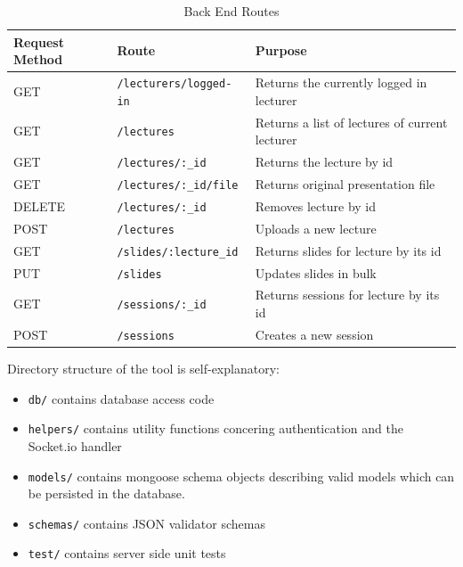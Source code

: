 \begin{table}[h!]
\centering
\begin{tabular}{|l|l|l|}
\hline
\textbf{Request Method} & \textbf{Route} & \textbf{Purpose} \\ \hline
GET   & \texttt{/lecturers/logged-in} & Returns the currently logged in lecturer \\ \hline

GET   & \texttt{/lectures}            & Returns a list of lectures of current lecturer \\ \hline
GET   & \texttt{/lectures/:\_id} & Returns the lecture by id \\ \hline
GET   & \texttt{/lectures/:\_id/file} & Returns original presentation file \\ \hline
DELETE   & \texttt{/lectures/:\_id} & Removes lecture by id \\ \hline
POST   & \texttt{/lectures} & Uploads a new lecture \\ \hline

GET   & \texttt{/slides/:lecture\_id} & Returns slides for lecture by its id \\ \hline
PUT   & \texttt{/slides} & Updates slides in bulk \\ \hline

GET   & \texttt{/sessions/:\_id} & Returns sessions for lecture by its id \\ \hline
POST   & \texttt{/sessions} & Creates a new session \\ \hline

\end{tabular}
\caption{Back End Routes}
\label{tab:routes}
\end{table}

Directory structure of the tool is self-explanatory:
\begin{itemize}
  \item \texttt{db/} contains database access code
  \item \texttt{helpers/} contains utility functions concering authentication and the Socket.io handler
  \item \texttt{models/} contains mongoose schema objects describing valid models which can be persisted in the database.
  \item \texttt{schemas/} contains JSON validator schemas
  \item \texttt{test/} contains server side unit tests
\end{itemize}

